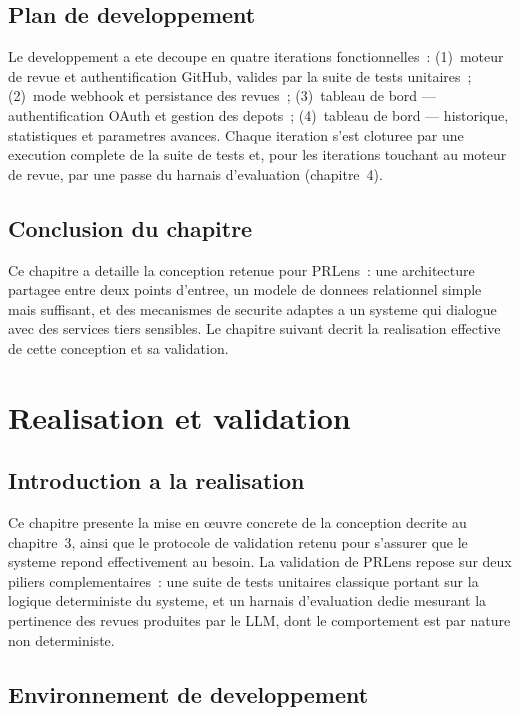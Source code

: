 \documentclass[a4paper,12pt,oneside]{report}
\begin{document}
\section{Plan de developpement}

Le developpement a ete decoupe en quatre iterations fonctionnelles~: (1)~moteur de revue et authentification GitHub, valides par la suite de tests unitaires~; (2)~mode webhook et persistance des revues~; (3)~tableau de bord --- authentification OAuth et gestion des depots~; (4)~tableau de bord --- historique, statistiques et parametres avances. Chaque iteration s'est cloturee par une execution complete de la suite de tests et, pour les iterations touchant au moteur de revue, par une passe du harnais d'evaluation (chapitre~4).

\section*{Conclusion du chapitre}

Ce chapitre a detaille la conception retenue pour PRLens~: une architecture partagee entre deux points d'entree, un modele de donnees relationnel simple mais suffisant, et des mecanismes de securite adaptes a un systeme qui dialogue avec des services tiers sensibles. Le chapitre suivant decrit la realisation effective de cette conception et sa validation.

\chapter{Realisation et validation}

\section{Introduction a la realisation}

Ce chapitre presente la mise en \oe uvre concrete de la conception decrite au chapitre~3, ainsi que le protocole de validation retenu pour s'assurer que le systeme repond effectivement au besoin. La validation de PRLens repose sur deux piliers complementaires~: une suite de tests unitaires classique portant sur la logique deterministe du systeme, et un harnais d'evaluation dedie mesurant la pertinence des revues produites par le LLM, dont le comportement est par nature non deterministe.

\section{Environnement de developpement}
\end{document}
